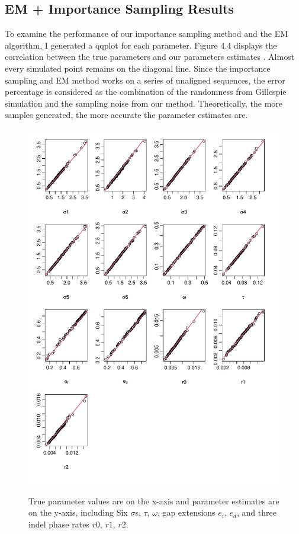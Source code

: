 \subsection{EM + Importance Sampling Results}
To examine the performance of our importance sampling method and the EM algorithm, I generated a qqplot for each parameter. Figure 4.4 displays the correlation between the true parameters and our parameters estimates . Almost every simulated point remains on the diagonal line. Since the importance sampling and EM method works on a series of unaligned sequences, the error percentage is considered as the combination of the randomness from Gillespie simulation and the sampling noise from our method. Theoretically, the more samples generated, the more accurate the parameter estimates are.   
\begin{figure}[H]
     \centering
     \begin{minipage}[t]{1\textwidth}
     \includegraphics[width=1\linewidth,height=1.2\linewidth]{Fig4.pdf}
     { {True parameter values are on the x-axis and parameter estimates are on the y-axis, including Six $\sigma$s, $\tau$, $\omega$, gap extensions $e_i$, $e_d$, and three indel phase rates $r0$, $r1$, $r2$.} 
 \par}
     \end{minipage}
\end{figure}

